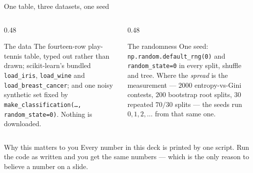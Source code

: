 \documentclass[aspectratio=169]{beamer}
\begin{document}
\begin{frame}{One table, three datasets, one seed}
  \begin{columns}[T]
    \begin{column}{0.48\textwidth}
      \begin{block}{The data}
        \small The fourteen-row play-tennis table, typed out rather than
        drawn; scikit-learn's bundled \texttt{load\_iris},
        \texttt{load\_wine} and \texttt{load\_breast\_cancer}; and one
        noisy synthetic set fixed by
        \texttt{make\_classification(\dots, random\_state=0)}. Nothing is
        downloaded.
      \end{block}
    \end{column}
    \begin{column}{0.48\textwidth}
      \begin{block}{The randomness}
        \small One seed: \texttt{np.random.default\_rng(0)} and
        \texttt{random\_state=0} in every split, shuffle and tree. Where the
        \emph{spread} is the measurement --- $2000$ entropy-vs-Gini contests,
        $200$ bootstrap root splits, $30$ repeated $70/30$ splits --- the
        seeds run $0, 1, 2, \dots$ from that same one.
      \end{block}
    \end{column}
  \end{columns}
  \vspace{0.5em}
  \begin{exampleblock}{Why this matters to you}
    \centering\small
    Every number in this deck is printed by one script. Run the code as
    written and you get the same numbers --- which is the only reason to
    believe a number on a slide.
  \end{exampleblock}
\end{frame}
\end{document}
